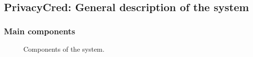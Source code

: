\documentclass[a4paper,12pt,english]{sphinxhowto}
\begin{document}
\subsection{PrivacyCred: General description of the system}
\label{\detokenize{ssi/privacycred:privacycred-general-description-of-the-system}}

\subsubsection{Main components}
\label{\detokenize{ssi/privacycred:main-components}}
\begin{figure}[htbp]
\centering
\capstart

\noindent{}
\caption{Components of the system.}\label{\detokenize{ssi/privacycred:id2}}\end{figure}
\end{document}
